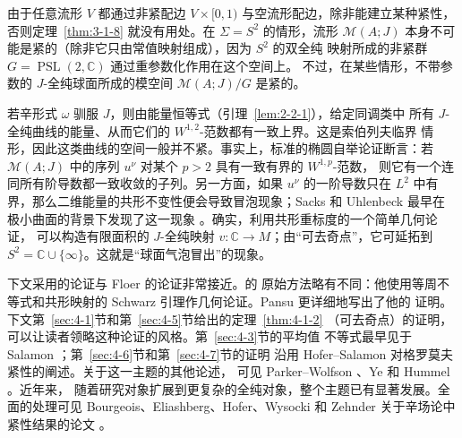 
由于任意流形 $V$ 都通过非紧配边 $V\times[0,1)$ 与空流形配边，除非能建立某种紧性，
否则定理~\ref{thm:3-1-8} 就没有用处。在 $\Sigma=S^2$ 的情形，流形
$\mathcal M(A;J)$ 本身不可能是紧的（除非它只由常值映射组成），因为 $S^2$ 的双全纯
映射所成的非紧群 $G=\operatorname{PSL}(2,\mathbb C)$ 通过重参数化作用在这个空间上。
不过，在某些情形，不带参数的 $J$-全纯球面所成的模空间
$\mathcal M(A;J)/G$ 是紧的。

若辛形式 $\omega$ 驯服 $J$，则由能量恒等式（引理~\ref{lem:2-2-1}），给定同调类中
所有 $J$-全纯曲线的能量、从而它们的 $W^{1,2}$-范数都有一致上界。这是索伯列夫临界
情形，因此这类曲线的空间一般并不紧。事实上，标准的椭圆自举论证断言：若
$\mathcal M(A;J)$ 中的序列 $u^\nu$ 对某个 $p>2$ 具有一致有界的 $W^{1,p}$-范数，
则它有一个连同所有阶导数都一致收敛的子列。另一方面，如果 $u^\nu$ 的一阶导数只在
$L^2$ 中有界，那么二维能量的共形不变性便会导致冒泡现象；Sacks 和 Uhlenbeck 最早在
极小曲面的背景下发现了这一现象 。确实，利用共形重标度的一个简单几何论证，
可以构造有限面积的 $J$-全纯映射 $v:\mathbb C\to M$；由“可去奇点”，它可延拓到
$S^2=\mathbb C\cup\{\infty\}$。这就是“球面气泡冒出”的现象。

下文采用的论证与 Floer 的论证非常接近。的
原始方法略有不同：他使用等周不等式和共形映射的
Schwarz 引理作几何论证。Pansu  更详细地写出了他的
证明。下文第~\ref{sec:4-1}节和第~\ref{sec:4-5}节给出的定理~\ref{thm:4-1-2}
（可去奇点）的证明，可以让读者领略这种论证的风格。第~\ref{sec:4-3}节的平均值
不等式最早见于 Salamon ；第~\ref{sec:4-6}节和第~\ref{sec:4-7}节的证明
沿用 Hofer--Salamon  对格罗莫夫紧性的阐述。关于这一主题的其他论述，
可见 Parker--Wolfson 、Ye  和 Hummel 。近年来，
随着研究对象扩展到更复杂的全纯对象，整个主题已有显著发展。全面的处理可见
Bourgeois、Eliashberg、Hofer、Wysocki 和 Zehnder
关于辛场论中紧性结果的论文 。

